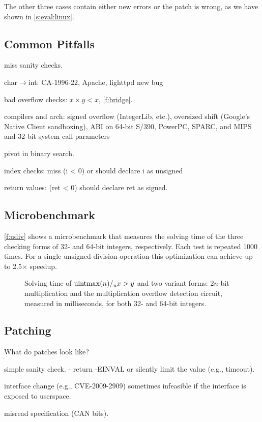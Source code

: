 The other three cases contain either new errors or the patch
is wrong, as we have shown in \autoref{s:eval:linux}.

\subsection{Common Pitfalls}
\label{s:eval:common}

miss sanity checks.

char$\to$int: 
CA-1996-22,
Apache,
lighttpd new bug

bad overflow checks: $x \times y < x$, 
\autoref{f:bridge}.

compilers and arch:
signed overflow (IntegerLib, etc.),
oversized shift (Google's Native Client sandboxing),
ABI on 64-bit S/390, PowerPC, SPARC, and MIPS
and 32-bit system call parameters~\cite[CVE-2009-0029]{cve}

pivot in binary search.

index checks:
miss (i < 0) or should declare i as unsigned

return values: (ret < 0)
should declare ret as signed.

\subsection{Microbenchmark}
\label{s:eval:micro}

\autoref{f:udiv} shows a microbenchmark that measures the solving
time of the three checking forms of 32- and 64-bit integers,
respectively.  Each test is repeated 1000 times.  For a single
unsigned division operation this optimization can achieve up to
2.5$\times$ speedup.

\begin{figure}
\centering

\caption{Solving time of $\operatorname{uintmax}(n) /_u x > y$ and two variant
forms: $2n$-bit multiplication and the multiplication overflow
detection circuit, measured in milliseconds, for both 32- and 64-bit
integers.}
\label{f:udiv}
\end{figure}

\subsection{Patching}

What do patches look like?

simple sanity check.
- return -EINVAL or silently limit the value (e.g., timeout).

interface change (e.g., CVE-2009-2909)
sometimes infeasible if the interface is exposed to userspace.

misread specification (CAN bits).


